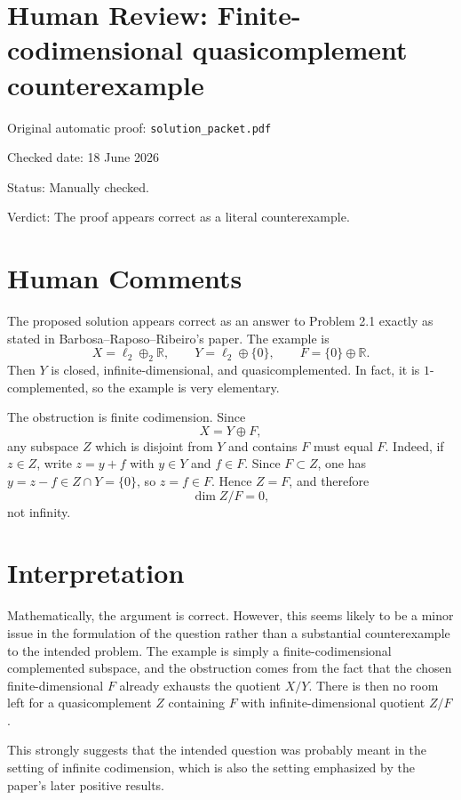 \documentclass[11pt]{article}
\begin{document}
\section*{Human Review: Finite-codimensional quasicomplement counterexample}

\noindent Original automatic proof: \texttt{solution\_packet.pdf}

\noindent Checked date: 18 June 2026

\noindent Status: Manually checked.

\noindent Verdict: The proof appears correct as a literal counterexample.

\section*{Human Comments}

The proposed solution appears correct as an answer to Problem 2.1 exactly as
stated in Barbosa--Raposo--Ribeiro's paper.  The example is
\[
  X=\ell_2\oplus_2 \mathbb R,
  \qquad
  Y=\ell_2\oplus\{0\},
  \qquad
  F=\{0\}\oplus\mathbb R.
\]
Then \(Y\) is closed, infinite-dimensional, and quasicomplemented.  In fact,
it is \(1\)-complemented, so the example is very elementary.

The obstruction is finite codimension.  Since
\[
  X=Y\oplus F,
\]
any subspace \(Z\) which is disjoint from \(Y\) and contains \(F\) must equal
\(F\).  Indeed, if \(z\in Z\), write \(z=y+f\) with \(y\in Y\) and
\(f\in F\).  Since \(F\subset Z\), one has \(y=z-f\in Z\cap Y=\{0\}\), so
\(z=f\in F\).  Hence \(Z=F\), and therefore
\[
  \dim Z/F=0,
\]
not infinity.

\section*{Interpretation}

Mathematically, the argument is correct.  However, this seems likely to be a
minor issue in the formulation of the question rather than a substantial
counterexample to the intended problem.  The example is simply a
finite-codimensional complemented subspace, and the obstruction comes from the
fact that the chosen finite-dimensional \(F\) already exhausts the quotient
\(X/Y\).  There is then no room left for a quasicomplement \(Z\) containing
\(F\) with infinite-dimensional quotient \(Z/F\).

This strongly suggests that the intended question was probably meant in the
setting of infinite codimension, which is also the setting emphasized by the
paper's later positive results.
\end{document}
